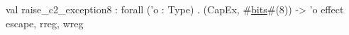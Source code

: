 val raise_c2_exception8 : forall ('o : Type) . (CapEx, #\hyperref[zbits]{bits}#(8)) -> 'o effect {escape, rreg, wreg}
